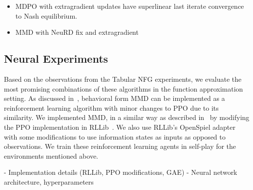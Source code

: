 \begin{itemize}
	\item{MDPO with extragradient updates have superlinear last iterate convergence to Nash
	            equilibrium.
	      }
	\item{MMD with NeuRD fix and extragradient }
\end{itemize}

\subsection{Neural Experiments}

Based on the observations from the Tabular NFG experiments, we evaluate the most promising
combinations of these algorithms in the function approximation setting.
As discussed in~\cite{sokotaUnified2023}, behavioral form MMD can be implemented as a reinforcement
learning algorithm with minor changes to PPO due to its similarity.
We implemented MMD, in a similar way as described in~\cite{sokotaUnified2023} by modifying the PPO
implementation in RLLib~\cite{liangRLlib2018}.
We also use RLLib's OpenSpiel adapter with some modifications to use information states as inputs
as opposed to observations.
We train these reinforcement learning agents in self-play for the environments mentioned above.

- Implementation details (RLLib, PPO modifications, GAE)
- Neural network architecture, hyperparameters

